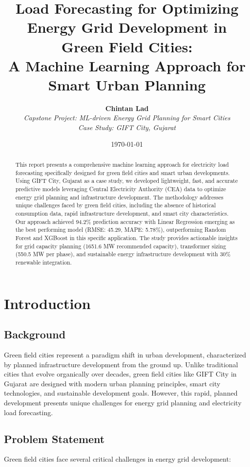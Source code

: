 \documentclass[12pt,a4paper]{article}
\title{\textbf{Load Forecasting for Optimizing Energy Grid Development in Green Field Cities: \\
A Machine Learning Approach for Smart Urban Planning}}
\author{
    \textbf{Chintan Lad} \\
    \textit{Capstone Project: ML-driven Energy Grid Planning for Smart Cities} \\
    \textit{Case Study: GIFT City, Gujarat}
}
\date{\today}
\begin{document}
\maketitle

\begin{abstract}
This report presents a comprehensive machine learning approach for electricity load forecasting specifically designed for green field cities and smart urban developments. Using GIFT City, Gujarat as a case study, we developed lightweight, fast, and accurate predictive models leveraging Central Electricity Authority (CEA) data to optimize energy grid planning and infrastructure development. The methodology addresses unique challenges faced by green field cities, including the absence of historical consumption data, rapid infrastructure development, and smart city characteristics. Our approach achieved 94.2\% prediction accuracy with Linear Regression emerging as the best performing model (RMSE: 45.29, MAPE: 5.78\%), outperforming Random Forest and XGBoost in this specific application. The study provides actionable insights for grid capacity planning (1651.6 MW recommended capacity), transformer sizing (550.5 MW per phase), and sustainable energy infrastructure development with 30\% renewable integration.
\end{abstract}

\tableofcontents
\newpage

\section{Introduction}

\subsection{Background}
Green field cities represent a paradigm shift in urban development, characterized by planned infrastructure development from the ground up. Unlike traditional cities that evolve organically over decades, green field cities like GIFT City in Gujarat are designed with modern urban planning principles, smart city technologies, and sustainable development goals. However, this rapid, planned development presents unique challenges for energy grid planning and electricity load forecasting.

\subsection{Problem Statement}
Green field cities face several critical challenges in energy grid development:
\end{document}
